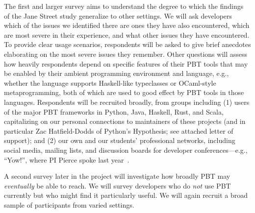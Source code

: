 The first and larger survey
aims to understand the degree to which
the findings of the Jane Street study generalize to other settings.
We will
ask developers which of the issues we identified there are
ones they have also encountered, which are most severe
in their experience, and what
other issues they have encountered.
To provide
clear usage scenarios, respondents will
be asked to give brief anecdotes elaborating on the
most severe issues they remember.  Other questions will assess how
heavily respondents depend on specific features of their PBT tools
that may be enabled by their
ambient programming environment and language, e.g., whether the
language supports Haskell-like typeclasses or OCaml-style
metaprogramming, both of which are used to good effect by
PBT tools in those languages.
Respondents will
be recruited broadly, from groups including
(1)
users of the major PBT frameworks in Python, Java, Haskell, Rust, and
Scala, capitalizing on our personal connections to maintainers of
these projects (and in particular Zac Hatfield-Dodds of Python's Hypothesis; see attached letter of support); and
(2) our own and our students' professional networks, including
social media, mailing lists, and discussion boards for developer
conferences---e.g., ``Yow!'', where PI Pierce spoke last
year~\cite{Pierce:Yow22}.

A second survey later in the project will investigate
how broadly PBT may {\em eventually} be able to reach.  We will
survey developers who do {\em not} use PBT
currently but who might find it particularly useful.
We will again recruit a broad sample of participants from varied settings.


%


